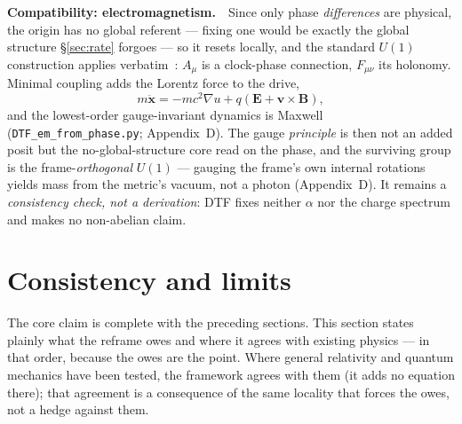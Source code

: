 \documentclass[11pt]{article}
\begin{document}
\medskip
\noindent\textbf{Compatibility: electromagnetism.}\ \
Since only phase \emph{differences} are physical, the origin has no global referent --- fixing one would be
exactly the global structure \S\ref{sec:rate} forgoes --- so it resets locally, and the standard $U(1)$
construction applies verbatim~\cite{Weyl1929,AharonovBohm1959}: $A_\mu$ is a clock-phase connection,
$F_{\mu\nu}$ its holonomy. Minimal coupling adds the Lorentz force to the drive,
\[
m\ddot{\mathbf x}=-mc^2\nabla u+q(\mathbf E+\mathbf v\times\mathbf B),
\]
and the lowest-order gauge-invariant dynamics is Maxwell (\texttt{DTF\_em\_from\_phase.py}; Appendix~D). The
gauge \emph{principle} is then not an added posit but the no-global-structure core read on the phase, and the
surviving group is the frame-\emph{orthogonal} $U(1)$ --- gauging the frame's own internal rotations yields
mass from the metric's vacuum, not a photon (Appendix~D). It remains a \emph{consistency check, not a
derivation}: DTF fixes neither $\alpha$ nor the charge spectrum and makes no non-abelian claim.

\section{Consistency and limits}\label{sec:consistency}

The core claim is complete with the preceding sections. This section states plainly what the reframe owes and
where it agrees with existing physics --- in that order, because the owes are the point. Where general
relativity and quantum mechanics have been tested, the framework agrees with them (it adds no equation there);
that agreement is a consequence of the same locality that forces the owes, not a hedge against them.
\end{document}
